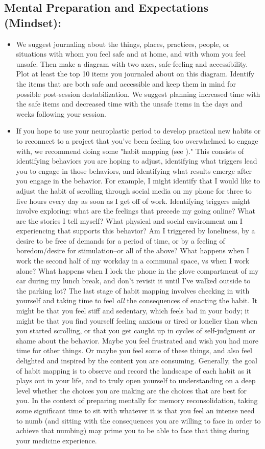 \documentclass[12pt,letterpaper]{book}
\begin{document}
\subsection*{Mental Preparation and Expectations (Mindset):}
\begin{itemize}
    \label{safetymapping}
    \item We suggest journaling about the things, places, practices, people, or situations with whom you feel safe and at home, and with whom you feel unsafe. Then make a diagram with two axes, safe-feeling and accessibility. Plot at least the top 10 items you journaled about on this diagram. Identify the items that are both safe and accessible and keep them in mind for possible post-session destabilization. We suggest planning increased time with the safe items and decreased time with the unsafe items in the days and weeks following your session.
    \item {} If you hope to use your neuroplastic period to develop practical new habits or to reconnect to a project that you've been feeling too overwhelmed to engage with, we recommend doing some "habit mapping (see \textcite{habitMapping})." This consists of identifying behaviors you are hoping to adjust, identifying what triggers lead you to engage in those behaviors, and identifying what results emerge after you engage in the behavior. For example, I might identify that I would like to adjust the habit of scrolling through social media on my phone for three to five hours every day as soon as I get off of work. Identifying triggers might involve exploring: what are the feelings that precede my going online? What are the stories I tell myself? What physical and social environment am I experiencing that supports this behavior? Am I triggered by loneliness, by a desire to be free of demands for a period of time, or by a feeling of boredom/desire for stimulation–or all of the above? What happens when I work the second half of my workday in a communal space, vs when I work alone? What happens when I lock the phone in the glove compartment of my car during my lunch break, and don't revisit it until I've walked outside to the parking lot? The last stage of habit mapping involves checking in with yourself and taking time to feel \textit{all} the consequences of enacting the habit. It might be that you feel stiff and sedentary, which feels bad in your body; it might be that you find yourself feeling anxious or tired or lonelier than when you started scrolling, or that you get caught up in cycles of self-judgment or shame about the behavior. Maybe you feel frustrated and wish you had more time for other things. Or maybe you feel some of these things, and also feel delighted and inspired by the content you are consuming. Generally, the goal of habit mapping is to observe and record the landscape of each habit as it plays out in your life, and to truly open yourself to understanding on a deep level whether the choices you are making are the choices that are best for you. In the context of preparing mentally for memory reconsolidation, taking some significant time to sit with whatever it is that you feel an intense need to numb (and sitting with the consequences you are willing to face in order to achieve that numbing) may prime you to be able to face that thing during your medicine experience.

\end{itemize}
\end{document}
